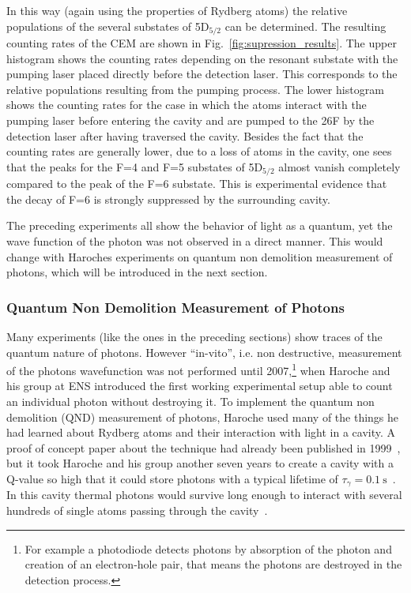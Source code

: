In this way (again using the properties of Rydberg atoms) the relative
populations of the several substates of 5D$_{5/2}$ can be determined. The
resulting counting rates of the CEM are shown in
Fig.~\ref{fig:supression_results}. The upper histogram shows the counting
rates depending on the resonant substate with the pumping laser placed directly before the
detection laser. This corresponds to the relative populations resulting from the
pumping process. The lower histogram shows the counting rates for the case
in which the atoms interact with the pumping laser before entering the cavity
and are pumped to the 26F by the detection laser after having traversed the
cavity. Besides the fact that the counting rates are generally lower, due to a
loss of atoms in the cavity, one sees that the peaks for the F=4 and F=5
substates of 5D$_{5/2}$ almost vanish completely compared to the peak of the F=6
substate. This is experimental evidence that the decay of F=6 is strongly
suppressed by the surrounding cavity.

The preceding experiments all show the behavior of light as a quantum, yet the
wave function of the photon was not observed in a direct manner. This would
change with Haroches experiments on quantum non demolition measurement of
photons, which will be introduced in the next section.


\subsubsection{Quantum Non Demolition Measurement of Photons}
\label{sec:QND}
Many experiments (like the ones in the preceding sections) show traces of the
quantum nature of photons. However ``in-vito'', i.e. non destructive,
measurement of the photons wavefunction was not performed until
2007,\footnote{For example a photodiode detects photons by absorption of the
  photon and creation of an electron-hole pair, that
means the photons are destroyed in the detection process.} when Haroche and his
group at ENS introduced the first working experimental setup able to count an
individual photon without destroying it. To implement the quantum non demolition
(QND) measurement of photons, Haroche used many of the things he had learned
about Rydberg atoms and their interaction with light in a cavity. A proof of
concept paper about the technique had already been published in 1999~\cite{haroche1999SinglePhoton}, 
but it took Haroche and his group another seven
years to create a cavity with a Q-value so high that it could store photons with
a typical lifetime of $\tau_\gamma = \SI{0.1}{\second}$~\cite{kuhr2006ultrahigh}. 
In this cavity thermal photons would survive long
enough to interact with several hundreds of single atoms passing through the
cavity~\cite{haroche2007QuantumJumps}.



